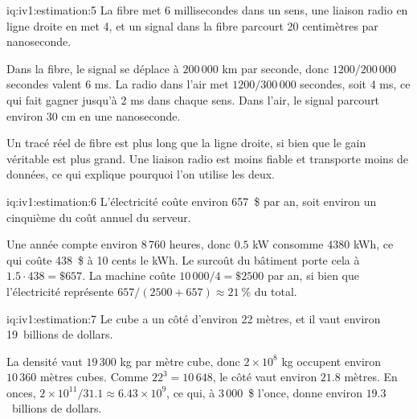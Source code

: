 \begin{solution}{iq:iv1:estimation:5}
La fibre met 6 millisecondes dans un sens, une liaison radio en ligne droite en met 4, et un signal dans la fibre parcourt 20 centimètres par nanoseconde.

Dans la fibre, le signal se déplace à $200\,000$ km par seconde, donc $1200/200\,000$ secondes valent 6 ms. La radio dans l'air met $1200/300\,000$ secondes, soit 4 ms, ce qui fait gagner jusqu'à 2 ms dans chaque sens. Dans l'air, le signal parcourt environ 30 cm en une nanoseconde.

Un tracé réel de fibre est plus long que la ligne droite, si bien que le gain véritable est plus grand. Une liaison radio est moins fiable et transporte moins de données, ce qui explique pourquoi l'on utilise les deux.

\end{solution}

\begin{solution}{iq:iv1:estimation:6}
L'électricité coûte environ 657~\$ par an, soit environ un cinquième du coût annuel du serveur.

Une année compte environ 8\,760 heures, donc $0.5$ kW consomme $4380$ kWh, ce qui coûte 438~\$ à 10 cents le kWh. Le surcoût du bâtiment porte cela à $1.5 \cdot 438 = \$657$. La machine coûte $10\,000/4 = \$2500$ par an, si bien que l'électricité représente $657/(2500 + 657) \approx 21~\%$ du total.

\end{solution}

\begin{solution}{iq:iv1:estimation:7}
Le cube a un côté d'environ 22 mètres, et il vaut environ 19~billions de dollars.

La densité vaut $19\,300$ kg par mètre cube, donc $2 \times 10^8$ kg occupent environ $10\,360$ mètres cubes. Comme $22^3 = 10\,648$, le côté vaut environ $21.8$ mètres. En onces, $2 \times 10^{11}/31.1 \approx 6.43 \times 10^9$, ce qui, à 3\,000~\$ l'once, donne environ $19.3$~billions de dollars.

\end{solution}

